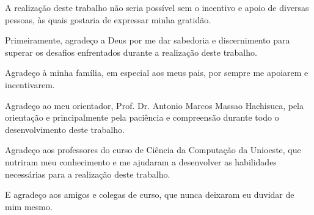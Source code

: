 
\begin{agradecimentos}

A realização deste trabalho não seria possível sem o incentivo e apoio de diversas pessoas, às
quais gostaria de expressar minha gratidão.

Primeiramente, agradeço a Deus por me dar sabedoria e discernimento para superar os desafios
enfrentados durante a realização deste trabalho.

Agradeço à minha família, em especial aos meus pais, por sempre me apoiarem e incentivarem.

Agradeço ao meu orientador, Prof. Dr. Antonio Marcos Massao Hachisuca, pela orientação e principalmente
pela paciência e compreensão durante todo o desenvolvimento deste trabalho.

Agradeço aos professores do curso de Ciência da Computação da Unioeste, que nutriram meu conhecimento 
e me ajudaram a desenvolver as habilidades necessárias para a realização deste trabalho.

E agradeço aos amigos e colegas de curso, que nunca deixaram eu duvidar de mim mesmo.

\end{agradecimentos}
